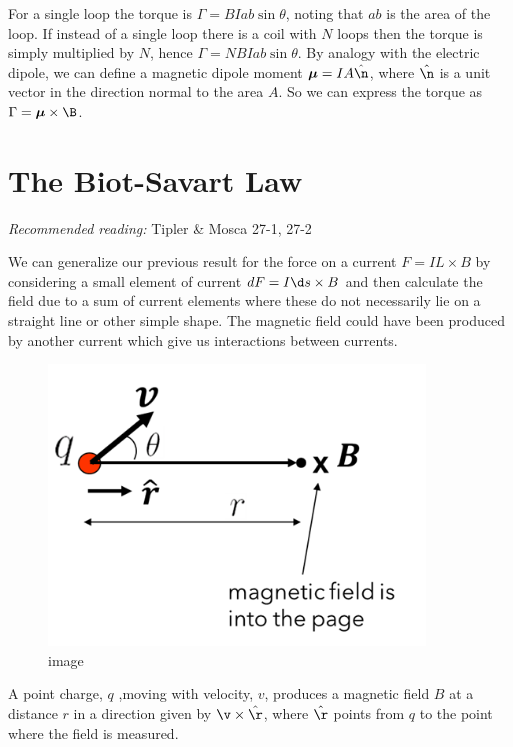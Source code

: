 \documentclass[
]{book}
\begin{document}
For a single loop the torque is \(\Gamma = BIab \sin\theta\), noting that
\(ab\) is the area of the loop. If instead of a single loop there is a
coil with \(N\) loops then the torque is simply multiplied by \(N\), hence
\(\Gamma = NBIab \sin\theta\). By analogy with the electric dipole, we can
define a magnetic dipole moment \(\boldsymbol{\mu} = IA \hat{\n}\), where
\(\hat{\n}\) is a unit vector in the direction normal to the area \(A\). So
we can express the torque as \(\Gamma = \boldsymbol{\mu} \times \B\).

\hypertarget{the-biot-savart-law}{%
\section{The Biot-Savart Law}\label{the-biot-savart-law}}

\emph{Recommended reading:} Tipler \& Mosca 27-1, 27-2

We can generalize our previous result for the force on a current
\(F = IL \times B\) by considering a small element of current
\(dF = I \d s \times B\) and then calculate the field due to a sum of
current elements where these do not necessarily lie on a straight line
or other simple shape. The magnetic field could have been produced by
another current which give us interactions between currents.

\begin{figure}
\centering
\includegraphics[width=100mm,height=\textheight]{Figures/fieldmovingcharge.png}
\caption{image}
\end{figure}

A point charge, \(q\) ,moving with velocity, \(v\), produces a magnetic
field \(B\) at a distance \(r\) in a direction given by
\(\v \times \hat{\r}\), where \(\hat{\r}\) points from \(q\) to the point
where the field is measured.
\end{document}
